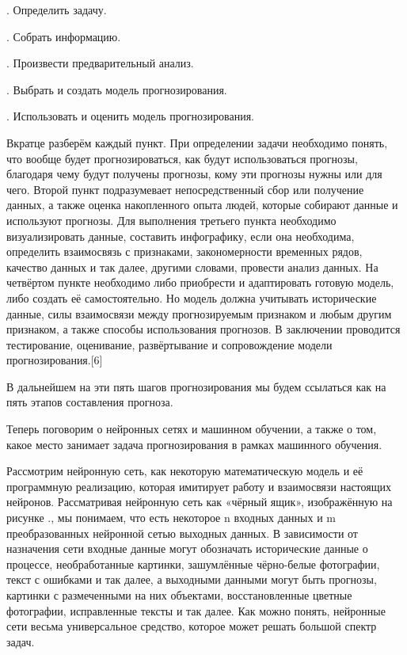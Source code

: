 {  \par {}. Определить задачу.
  \par {}. Собрать информацию.
  \par {}. Произвести предварительный анализ.
  \par {}. Выбрать и создать модель прогнозирования.
  \par {}. Использовать и оценить модель прогнозирования.

  \par \redline Вкратце разберём каждый пункт. При определении задачи необходимо понять, что вообще будет прогнозироваться, как будут использоваться прогнозы, благодаря чему будут получены прогнозы, кому эти прогнозы нужны или для чего. Второй пункт подразумевает непосредственный сбор или получение данных, а также оценка накопленного опыта людей, которые собирают данные и используют прогнозы. Для выполнения третьего пункта необходимо визуализировать данные, составить инфографику, если она необходима, определить взаимосвязь с признаками, закономерности временных рядов, качество данных и так далее, другими словами, провести анализ данных. На четвёртом пункте необходимо либо приобрести и адаптировать готовую модель, либо создать её самостоятельно. Но модель должна учитывать исторические данные, силы взаимосвязи между прогнозируемым признаком и любым другим признаком, а также способы использования прогнозов. В заключении проводится тестирование, оценивание, развёртывание и сопровождение модели прогнозирования.[6]

  \par \redline В дальнейшем на эти пять шагов прогнозирования мы будем ссылаться как на пять этапов составления прогноза.

  \par \redline Теперь поговорим о нейронных сетях и машинном обучении, а также о том, какое место занимает задача прогнозирования в рамках машинного обучения.

  \par \redline Рассмотрим нейронную сеть, как некоторую математическую модель и её программную реализацию, которая имитирует работу и взаимосвязи настоящих нейронов.  Рассматривая нейронную сеть как «чёрный ящик», изображённую на рисунке \thechaptercntr .\theimagecntr, мы понимаем, что есть некоторое n входных данных и m преобразованных нейронной сетью выходных данных. В зависимости от назначения сети входные данные могут обозначать исторические данные о процессе, необработанные картинки, зашумлённые чёрно-белые фотографии, текст с ошибками и так далее, а выходными данными могут быть прогнозы, картинки с размеченными на них объектами, восстановленные цветные фотографии, исправленные тексты и так далее. Как можно понять, нейронные сети весьма универсальное средство, которое может решать большой спектр задач.

}
